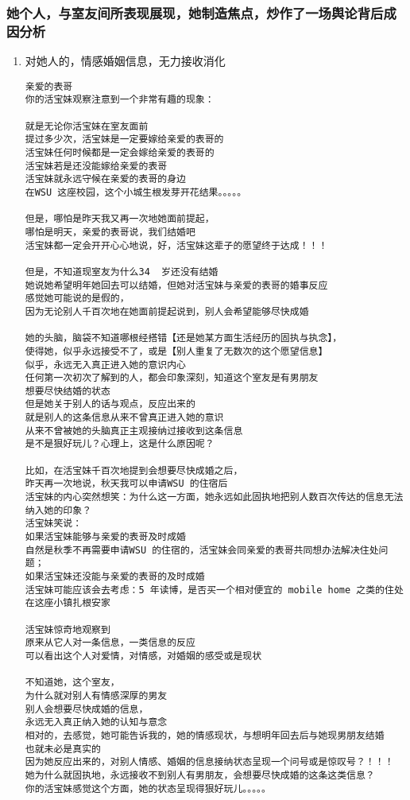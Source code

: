 \documentclass[9pt, b5paper]{article}
\begin{document}
\subsubsection{她个人，与室友间所表现展现，她制造焦点，炒作了一场舆论背后成因分析}
\label{sec-3-2-3}
\begin{enumerate}
\item 对她人的，情感婚姻信息，无力接收消化
\label{sec-3-2-3-1}
\begin{verbatim}
亲爱的表哥
你的活宝妹观察注意到一个非常有趣的现象：

就是无论你活宝妹在室友面前
提过多少次，活宝妹是一定要嫁给亲爱的表哥的
活宝妹任何时候都是一定会嫁给亲爱的表哥的
活宝妹若是还没能嫁给亲爱的表哥
活宝妹就永远守候在亲爱的表哥的身边
在WSU 这座校园，这个小城生根发芽开花结果。。。。。

但是，哪怕是昨天我又再一次地她面前提起，
哪怕是明天，亲爱的表哥说，我们结婚吧
活宝妹都一定会开开心心地说，好，活宝妹这辈子的愿望终于达成！！！

但是，不知道现室友为什么34  岁还没有结婚
她说她希望明年她回去可以结婚，但她对活宝妹与亲爱的表哥的婚事反应
感觉她可能说的是假的，
因为无论别人千百次地在她面前提起说到，别人会希望能够尽快成婚

她的头脑，脑袋不知道哪根经搭错【还是她某方面生活经历的固执与执念】，
使得她，似乎永远接受不了，或是【别人重复了无数次的这个愿望信息】
似乎，永远无入真正进入她的意识内心
任何第一次初次了解到的人，都会印象深刻，知道这个室友是有男朋友
想要尽快结婚的状态
但是她关于别人的话与观点，反应出来的
就是别人的这条信息从来不曾真正进入她的意识
从来不曾被她的头脑真正主观接纳过接收到这条信息
是不是狠好玩儿？心理上，这是什么原因呢？

比如，在活宝妹千百次地提到会想要尽快成婚之后，
昨天再一次地说，秋天我可以申请WSU 的住宿后
活宝妹的内心突然想笑：为什么这一方面，她永远如此固执地把别人数百次传达的信息无法纳入她的印象？
活宝妹笑说：
如果活宝妹能够与亲爱的表哥及时成婚
自然是秋季不再需要申请WSU 的住宿的，活宝妹会同亲爱的表哥共同想办法解决住处问题；
如果活宝妹还没能与亲爱的表哥的及时成婚
活宝妹可能应该会去考虑：5 年读博，是否买一个相对便宜的 mobile home 之类的住处
在这座小镇扎根安家

活宝妹惊奇地观察到
原来从它人对一条信息，一类信息的反应
可以看出这个人对爱情，对情感，对婚姻的感受或是现状

不知道她，这个室友，
为什么就对别人有情感深厚的男友
别人会想要尽快成婚的信息，
永远无入真正纳入她的认知与意念
相对的，去感觉，她可能告诉我的，她的情感现状，与想明年回去后与她现男朋友结婚
也就未必是真实的
因为她反应出来的，对别人情感、婚姻的信息接纳状态呈现一个问号或是惊叹号？！！！
她为什么就固执地，永远接收不到别人有男朋友，会想要尽快成婚的这条这类信息？
你的活宝妹感觉这个方面，她的状态呈现得狠好玩儿。。。。。


\end{verbatim}
\end{enumerate}
\end{document}
